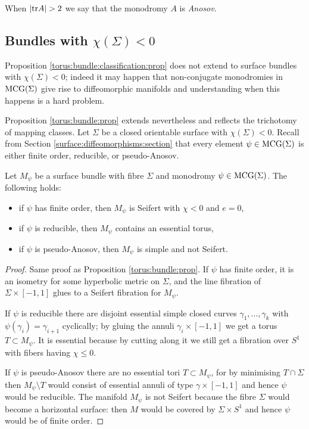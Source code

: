 When $|{\rm tr} A| > 2$ we say that the monodromy $A$ is \emph{Anosov}.

\subsection{Bundles with $\chi(\Sigma) <0$}
Proposition \ref{torus:bundle:classification:prop} does not extend to surface bundles with $\chi(\Sigma)<0$; indeed it may happen that non-conjugate monodromies in ${\rm MCG}(\Sigma)$ give rise to diffeomorphic manifolds and understanding when this happens is a hard problem.

Proposition \ref{torus:bundle:prop} extends nevertheless and reflects the trichotomy of mapping classes. Let $\Sigma$ be a closed orientable surface with $\chi(\Sigma)<0$.
Recall from Section \ref{surface:diffeomorphisms:section} that every element $\psi\in{\rm MCG}(\Sigma)$ is either finite order, reducible, or pseudo-Anosov.

\begin{prop} \label{trichotomy:prop}
Let $M_\psi$ be a surface bundle with fibre $\Sigma$ and monodromy $\psi\in{\rm MCG}(\Sigma)$. The following holds:
\begin{itemize}
\item if $\psi$ has finite order, then $M_\psi$ is Seifert with $\chi <0$ and $e=0$,
\item if $\psi$ is reducible, then $M_\psi$ contains an essential torus,
\item if $\psi$ is pseudo-Anosov, then $M_\psi$ is simple and not Seifert.
\end{itemize}
\end{prop}
\begin{proof}
Same proof as Proposition \ref{torus:bundle:prop}. If $\psi$ has finite order, it is an isometry for some hyperbolic metric on $\Sigma$, and the line fibration of $\Sigma \times [-1,1]$ glues to a Seifert fibration for $M_\psi$. 

If $\psi$ is reducible there are disjoint essential simple closed curves $\gamma_1,\ldots, \gamma_k$ with $\psi(\gamma_i) = \gamma_{i+1}$ cyclically; by gluing the annuli $\gamma_i \times [-1,1]$ we get a torus $T\subset M_\psi$. It is essential because by cutting along it we still get a fibration over $S^1$ with fibers having $\chi \leqslant 0$.

If $\psi$ is pseudo-Anosov there are no essential tori $T\subset M_\psi$, for by minimising $T\cap \Sigma$ then $M_\psi \setminus T$ would consist of essential annuli of type $\gamma \times [-1,1]$ and hence $\psi$ would be reducible.
The manifold $M_\psi$ is not Seifert because the fibre $\Sigma$ would become a horizontal surface: then $M$ would be covered by $\Sigma \times S^1$ and hence $\psi$ would be of finite order.
\end{proof}


